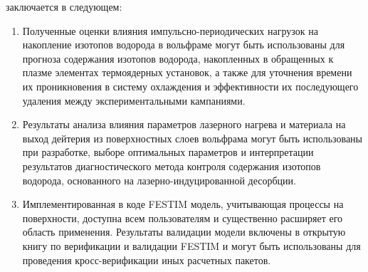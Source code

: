 {\influence} заключается в следующем:
\begin{enumerate}[beginpenalty=10000] %
    \item Полученные оценки влияния импульсно-периодических нагрузок на накопление изотопов водорода в вольфраме могут быть использованы для прогноза содержания изотопов водорода, накопленных в обращенных к плазме элементах термоядерных установок, а также для уточнения времени их проникновения в систему охлаждения и эффективности их последующего удаления между экспериментальными кампаниями.
    \item Результаты анализа влияния параметров лазерного нагрева и материала на выход дейтерия из поверхностных слоев вольфрама могут быть использованы при разработке, выборе оптимальных параметров и интерпретации результатов диагностического метода контроля содержания изотопов водорода, основанного на лазерно-индуцированной десорбции.
    \item Имплементированная в коде FESTIM модель, учитывающая процессы на поверхности, доступна всем пользователям и существенно расширяет его область применения. Результаты валидации модели включены в открытую книгу по верификации и валидации FESTIM и могут быть использованы для проведения кросс-верификации иных расчетных пакетов.
\end{enumerate}

